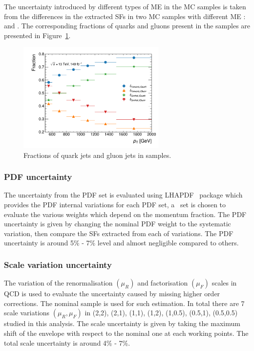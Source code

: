 The  uncertainty introduced by different types of ME in the MC samples is taken from the differences in the extracted SFs in two MC samples with different ME : \powheg and \pythia. The corresponding fractions of quarks and gluons present in the \powheg samples are presented in Figure~\ref{fig:QG-pow-Frac}. 


\begin{figure}[htb]
	\centering
	\label{fig:QG-pow-Fmc}\includegraphics[width=0.65\textwidth]{fig/powhegpythia/plots/ADE/Fractions/none_event_weight/Fraction.pdf}
	\caption[]{
		Fractions of quark jets and gluon jets in \powheg samples. %
		\label{fig:QG-pow-Frac}
	}
\end{figure}

\FloatBarrier
    \subsubsection{PDF uncertainty}
  The uncertainty from the PDF set is evaluated using \textsc{LHAPDF}~\cite{LHAPDF} package which provides the PDF internal variations for each PDF set, a \nnpdftwo~set is chosen to evaluate the various weights which depend on the momentum fraction. The PDF uncertainty is given by changing the nominal PDF weight to the systematic variation, then compare the SFs extracted from each of variations. The PDF uncertainty is around 5\% - 7\% level and almost negligible compared to others.

  
    \subsubsection{Scale variation uncertainty}
  The variation of the renormalisation $(\mu_R)$ and factorisation $(\mu_F)$ scales in QCD is used to evaluate the uncertainty caused by missing higher order corrections. The nominal \pythia sample is used for such estimation. In total there are 7 scale variations
  $(\mu_R, \mu_F)$ in (2,2), (2,1), (1,1), (1,2), (1,0.5), (0.5,1), (0.5,0.5) studied in this analysis. The scale uncertainty is given by taking the maximum shift of the envelope with respect to the nominal one at each working points. The total scale uncertainty is around 4\% - 7\%. 

